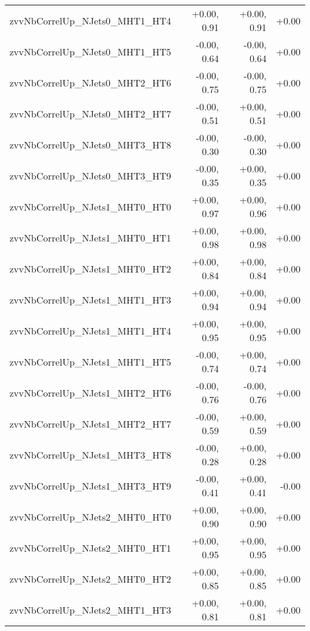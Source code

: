 \begin{tabular}{|l|r|r|r|}
zvvNbCorrelUp\_NJets0\_MHT1\_HT4         &      +0.00, 0.91 &     +0.00, 0.91 &  +0.00 \\
zvvNbCorrelUp\_NJets0\_MHT1\_HT5         &      -0.00, 0.64 &     -0.00, 0.64 &  +0.00 \\
zvvNbCorrelUp\_NJets0\_MHT2\_HT6         &      -0.00, 0.75 &     -0.00, 0.75 &  +0.00 \\
zvvNbCorrelUp\_NJets0\_MHT2\_HT7         &      -0.00, 0.51 &     +0.00, 0.51 &  +0.00 \\
zvvNbCorrelUp\_NJets0\_MHT3\_HT8         &      -0.00, 0.30 &     -0.00, 0.30 &  +0.00 \\
zvvNbCorrelUp\_NJets0\_MHT3\_HT9         &      -0.00, 0.35 &     +0.00, 0.35 &  +0.00 \\
zvvNbCorrelUp\_NJets1\_MHT0\_HT0         &      +0.00, 0.97 &     +0.00, 0.96 &  +0.00 \\
zvvNbCorrelUp\_NJets1\_MHT0\_HT1         &      +0.00, 0.98 &     +0.00, 0.98 &  +0.00 \\
zvvNbCorrelUp\_NJets1\_MHT0\_HT2         &      +0.00, 0.84 &     +0.00, 0.84 &  +0.00 \\
zvvNbCorrelUp\_NJets1\_MHT1\_HT3         &      +0.00, 0.94 &     +0.00, 0.94 &  +0.00 \\
zvvNbCorrelUp\_NJets1\_MHT1\_HT4         &      +0.00, 0.95 &     +0.00, 0.95 &  +0.00 \\
zvvNbCorrelUp\_NJets1\_MHT1\_HT5         &      -0.00, 0.74 &     +0.00, 0.74 &  +0.00 \\
zvvNbCorrelUp\_NJets1\_MHT2\_HT6         &      -0.00, 0.76 &     -0.00, 0.76 &  +0.00 \\
zvvNbCorrelUp\_NJets1\_MHT2\_HT7         &      -0.00, 0.59 &     +0.00, 0.59 &  +0.00 \\
zvvNbCorrelUp\_NJets1\_MHT3\_HT8         &      -0.00, 0.28 &     +0.00, 0.28 &  +0.00 \\
zvvNbCorrelUp\_NJets1\_MHT3\_HT9         &      -0.00, 0.41 &     +0.00, 0.41 &  -0.00 \\
zvvNbCorrelUp\_NJets2\_MHT0\_HT0         &      +0.00, 0.90 &     +0.00, 0.90 &  +0.00 \\
zvvNbCorrelUp\_NJets2\_MHT0\_HT1         &      +0.00, 0.95 &     +0.00, 0.95 &  +0.00 \\
zvvNbCorrelUp\_NJets2\_MHT0\_HT2         &      +0.00, 0.85 &     +0.00, 0.85 &  +0.00 \\
zvvNbCorrelUp\_NJets2\_MHT1\_HT3         &      +0.00, 0.81 &     +0.00, 0.81 &  +0.00 \\

\end{tabular}
